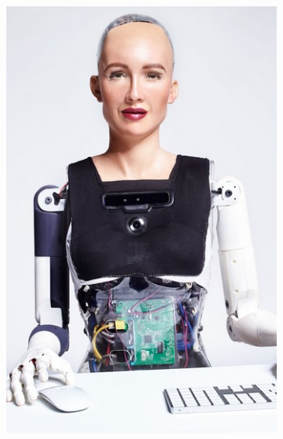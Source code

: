 \documentclass[runningheads,a4paper,12pt]{report}
\begin{document}
\begin{figure}
\begin{subfigure}{.3\textwidth}
  	\centering
  	\includegraphics[width=\linewidth]{./images/1_sophia}
  	\caption{}
  	\label{fig:sophia}
  \end{subfigure} 
  \hfill
  \begin{subfigure}{.4\textwidth}
  	\centering

\end{subfigure}
\end{figure}
\end{document}
